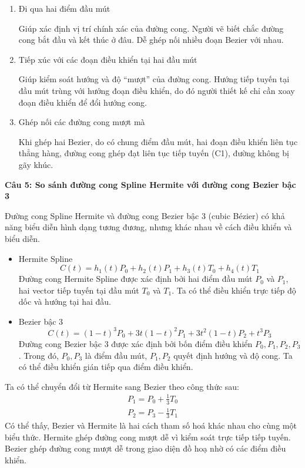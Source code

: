 \begin{enumerate}
	\item Đi qua hai điểm đầu mút
	
	Giúp xác định vị trí chính xác của đường cong. Người vẽ biết chắc đường cong bắt đầu và kết thúc ở đâu. Dễ ghép nối nhiều đoạn Bezier với nhau.
	
	\item Tiếp xúc với các đoạn điều khiển tại hai đầu mút
	
	Giúp kiểm soát hướng và độ “mượt” của đường cong. Hướng tiếp tuyến tại đầu mút trùng với hướng đoạn điều khiển, do đó người thiết kế chỉ cần xoay đoạn điều khiển để đổi hướng cong.
	
	\item Ghép nối các đường cong mượt mà 
	
	Khi ghép hai Bezier, do có chung điểm đầu mút, hai đoạn điều khiển liên tục thẳng hàng, đường cong ghép đạt liên tục tiếp tuyến (C1), đường không bị gãy khúc.
\end{enumerate}

\textbf{Câu 5: So sánh đường cong Spline Hermite với đường cong Bezier bậc 3}

Đường cong Spline Hermite và đường cong Bezier bậc 3 (cubic Bézier) có khả năng biểu diễn hình dạng tương đương, nhưng khác nhau về cách điều khiển và biểu diễn.

\begin{itemize}
	\item Hermite Spline
	\[C(t) = h_1(t) P_0 + h_2(t) P_1 + h_3(t) T_0 + h_4(t) T_1\]
	Đường cong Hermite Spline được xác định bởi hai điểm đầu mút $P_0$ và $P_1$, hai vector tiếp tuyến tại đầu mút $T_0$ và $T_1$. Ta có thể điều khiển trực tiếp độ dốc và hướng tại hai đầu.
	
	\item Bezier bậc 3
	\[C(t) = (1-t)^3 P_0 + 3t(1-t)^2 P_1 + 3t^2(1-t) P_2 + t^3 P_3\]
	Đường cong Bezier bậc 3 được xác định bởi bốn điểm điều khiển $P_0, P_1, P_2, P_3$. Trong đó, $P_0, P_3$ là điểm đầu mút, $P_1, P_2$ quyết định hướng và độ cong. Ta có thể điều khiển gián tiếp qua điểm điều khiển.
\end{itemize}

Ta có thể chuyển đổi từ Hermite sang Bezier theo công thức sau:
\begin{gather*}
	P_1 = P_0 + \frac{1}{3} T_0 \\
	P_2 = P_3 - \frac{1}{3} T_1
\end{gather*}
Có thể thấy, Bezier và Hermite là hai cách tham số hoá khác nhau cho cùng một biểu thức. Hermite ghép đường cong mượt dễ vì kiểm soát trực tiếp tiếp tuyến. Bezier ghép đường cong mượt dễ trong giao diện đồ hoạ nhờ có các điểm điều khiển.

